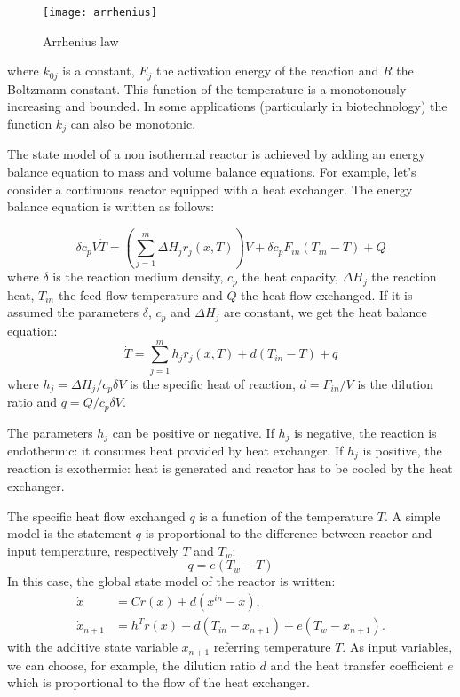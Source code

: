 \begin{figure}[htbp] 
   \centering
   \texttt{[image: arrhenius]} 
   \caption{Arrhenius law}
   \label{Fig:arrhenius}
\end{figure}

where $k_{0j}$ is a constant, $E_j$ the activation energy of the reaction and $R$ the Boltzmann constant.
This function of the temperature is a monotonously increasing and bounded.
In some applications (particularly in biotechnology) the function $k_j$ can also be monotonic.

The state model of a non isothermal reactor is achieved by adding an energy balance equation to mass and volume balance equations. 
For example, let's consider a continuous reactor equipped with a heat exchanger. 
The energy balance equation is written as follows:

$$
\delta c_p V\dot T = (\sum_{j=1}^{m}\Delta H_j r_j(x,T))V +
\delta c_p F_{in} (T_{in} - T) + Q
$$
where $\delta$ is the reaction medium density, $c_p$ the heat capacity, $\Delta H_j$ the reaction heat, $T_{in}$  the feed flow temperature and $Q$ the heat flow exchanged.
If it is assumed the parameters $\delta$, $c_p$ and $\Delta H_j$ are constant, we get the heat balance equation: 
$$ 
\dot T = \sum_{j=1}^{m} h_j r_j(x,T) +
d(T_{in} - T) + q
$$
where $h_j = \Delta H_j/c_p\delta V$ is the specific heat of reaction, $d = F_{in}/V$ is the dilution ratio and $q = Q/c_p \delta V$.

The parameters $h_j$ can be positive or negative. 
If $h_j$ is negative, the reaction is endothermic: it consumes heat provided by heat exchanger.
If $h_j$ is positive, the reaction is exothermic: heat is generated and reactor has to be cooled by the heat exchanger.

The specific heat flow exchanged $q$ is a function of the temperature $T$.
A simple model is the statement $q$ is proportional to the difference between reactor and input temperature, respectively $T$ and $T_w$:
$$ q = e(T_w - T) $$
In this case, the global state model of the reactor is written:
\begin{equation*} \begin{split}
\dot x &= Cr(x) + d(x^{in} - x), \\
\dot x_{n+1} &= h^T r(x) + d(T_{in} - x_{n+1}) + e(T_w - x_{n+1}).
\end{split} \end{equation*}
with the additive state variable $x_{n+1}$ referring temperature $T$.
As input variables, we can choose, for example, the dilution ratio $d$ and the heat transfer coefficient $e$ which is proportional to the flow of the heat exchanger.

